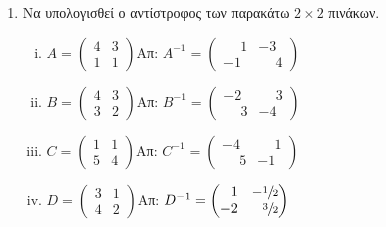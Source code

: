 \documentclass[a4paper,table]{report}
\begin{document}
\begin{center}
  \minibox{\large\bf \textcolor{Col1}{Ασκήσεις Αντίστροφος Πίνακας}}
\end{center}

\vspace{\baselineskip}

\begin{enumerate}
  \item Να υπολογισθεί ο αντίστροφος των παρακάτω $2\times 2$ πινάκων.

    \begin{enumerate}[i)]
      \item $A=\begin{pmatrix}
          4 & 3 \\
          1 & 1
          \end{pmatrix}$\hfill Απ: $Α^{-1}=\begin{pmatrix}
          \phantom{-}1 & -3 \\
          -1 & \phantom{-}4
        \end{pmatrix}$

      \item $B=\begin{pmatrix}
          4 & 3 \\
          3 & 2
          \end{pmatrix}$\hfill Απ: $B^{-1}=\begin{pmatrix}
          -2 & \phantom{-}3 \\
          \phantom{-}3 & -4
        \end{pmatrix}$

      \item $C=\begin{pmatrix}
          1 & 1 \\
          5 & 4
          \end{pmatrix}$\hfill Απ: $C^{-1}=\begin{pmatrix}
          -4 & \phantom{-}1 \\
          \phantom{-}5 & -1
        \end{pmatrix}$

      \item $D=\begin{pmatrix}
          3 & 1 \\
          4 & 2
          \end{pmatrix}$\hfill Απ: $D^{-1}=\begin{pmatrix}
          \phantom{-}1 & -\sfrac{1}{2} \\
          -2 & \phantom{-}\sfrac{3}{2}
        \end{pmatrix}$
    \end{enumerate}


\end{enumerate}
\end{document}
